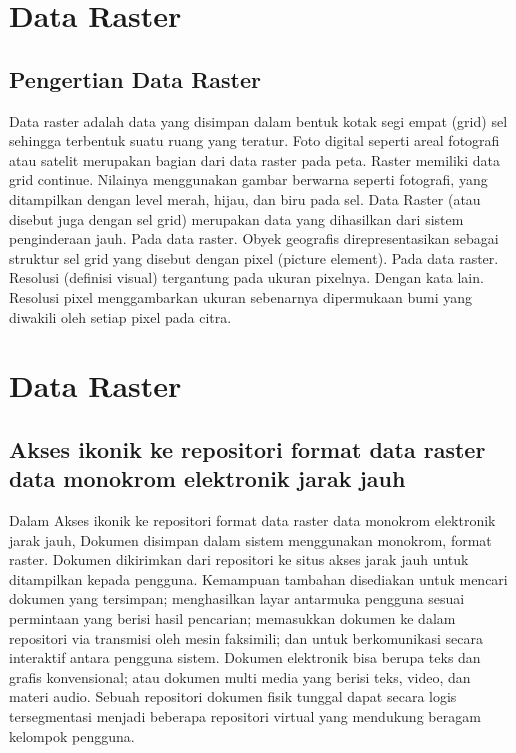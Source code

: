 
\section{Data Raster}
\subsection{Pengertian Data Raster}
Data raster adalah data yang disimpan dalam bentuk kotak segi empat (grid) sel sehingga terbentuk suatu ruang yang 
teratur. Foto digital seperti areal fotografi atau satelit merupakan bagian dari data raster pada peta. 
Raster memiliki data grid continue. Nilainya menggunakan gambar berwarna seperti fotografi, yang ditampilkan dengan 
level merah, hijau, dan biru pada sel. Data Raster (atau disebut juga dengan sel grid) merupakan data yang 
dihasilkan dari sistem penginderaan jauh. Pada data raster. Obyek geografis direpresentasikan sebagai struktur
sel grid yang disebut dengan pixel (picture element). Pada data raster. Resolusi (definisi visual) tergantung
pada ukuran pixelnya. Dengan kata lain. Resolusi pixel menggambarkan ukuran sebenarnya dipermukaan bumi 
yang diwakili oleh setiap pixel pada citra.
\section{Data Raster}
\subsection{Akses ikonik ke repositori format data raster data monokrom elektronik jarak jauh}
Dalam Akses ikonik ke repositori format data raster data monokrom elektronik jarak jauh, 
Dokumen disimpan dalam sistem menggunakan monokrom, format raster. 
Dokumen dikirimkan dari repositori ke situs akses jarak jauh untuk ditampilkan kepada pengguna. 
Kemampuan tambahan disediakan untuk mencari dokumen yang tersimpan; 
menghasilkan layar antarmuka pengguna sesuai permintaan yang berisi hasil pencarian; 
memasukkan dokumen ke dalam repositori via transmisi oleh mesin faksimili; 
dan untuk berkomunikasi secara interaktif antara pengguna sistem. 
Dokumen elektronik bisa berupa teks dan grafis konvensional; 
atau dokumen multi media yang berisi teks, video, dan materi audio. 
Sebuah repositori dokumen fisik tunggal dapat secara logis tersegmentasi menjadi
beberapa repositori virtual yang mendukung beragam kelompok pengguna.
